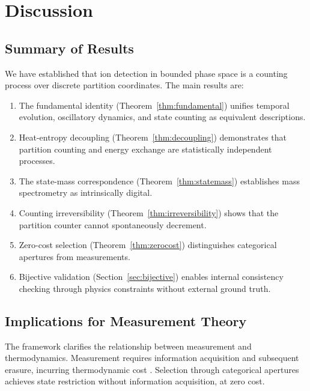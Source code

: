 \documentclass[twocolumn,10pt]{article}
\begin{document}
\section{Discussion}
\label{sec:discussion}

\subsection{Summary of Results}

We have established that ion detection in bounded phase space is a counting process over discrete partition coordinates. The main results are:

\begin{enumerate}
    \item The fundamental identity (Theorem~\ref{thm:fundamental}) unifies temporal evolution, oscillatory dynamics, and state counting as equivalent descriptions.

    \item Heat-entropy decoupling (Theorem~\ref{thm:decoupling}) demonstrates that partition counting and energy exchange are statistically independent processes.

    \item The state-mass correspondence (Theorem~\ref{thm:statemass}) establishes mass spectrometry as intrinsically digital.

    \item Counting irreversibility (Theorem~\ref{thm:irreversibility}) shows that the partition counter cannot spontaneously decrement.

    \item Zero-cost selection (Theorem~\ref{thm:zerocost}) distinguishes categorical apertures from measurements.

    \item Bijective validation (Section~\ref{sec:bijective}) enables internal consistency checking through physics constraints without external ground truth.
\end{enumerate}

\subsection{Implications for Measurement Theory}

The framework clarifies the relationship between measurement and thermodynamics. Measurement requires information acquisition and subsequent erasure, incurring thermodynamic cost \citep{bennett1982}. Selection through categorical apertures achieves state restriction without information acquisition, at zero cost.
\end{document}
